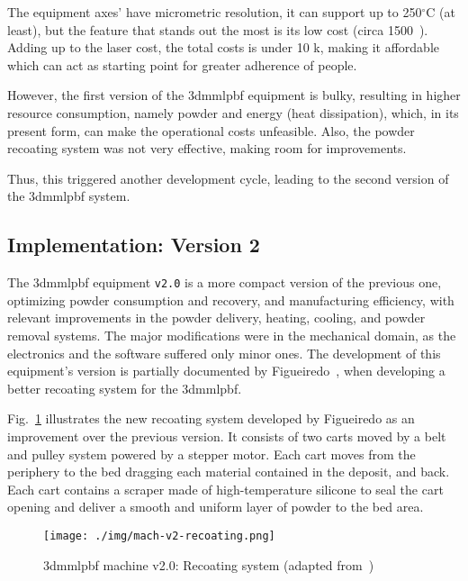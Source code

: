 The equipment axes' have micrometric resolution, it can support up to
250$^{\circ}$C (at least), but the feature that stands out the most is its low
cost (circa 1500~\texteuro). Adding up to the laser cost, the total costs is
under 10 k\texteuro, making it affordable which can act as starting point for
greater adherence of people.

However, the first version of the \gls{3dmmlpbf} equipment is bulky, resulting in
higher resource consumption, namely powder and energy (heat dissipation), which,
in its present form, can make the operational costs unfeasible. Also, the powder
recoating system was not very effective, making room for improvements.

Thus, this triggered another development cycle, leading to the second version
of the \gls{3dmmlpbf} system.

\subsection{Implementation: Version 2}%
\label{sec:version-2}
The \gls{3dmmlpbf} equipment \texttt{v2.0} is a more compact version of the
previous one, optimizing powder consumption and recovery, and manufacturing
efficiency, with relevant improvements in the powder delivery, heating, cooling,
and powder removal systems.
The major modifications were in the mechanical domain, as the electronics and
the software suffered only minor ones.
The development of this equipment's version is partially documented by
Figueiredo~\cite{diogoTese}, when developing a better recoating system for the
\gls{3dmmlpbf}.

Fig.~\ref{fig:mach-v2-recoat} illustrates the new recoating system
developed by Figueiredo as an improvement over the previous version. It consists
of two carts moved by a belt and pulley system powered by a stepper motor. Each
cart moves from the periphery to the bed dragging each material contained in the
deposit, and back. Each cart contains a scraper made of high-temperature
silicone to seal the cart opening and deliver a smooth and uniform layer of
powder to the bed area.
%
\begin{figure}[!hbt]
  \centering
    \texttt{[image: ./img/mach-v2-recoating.png]}
  \caption[\gls{3dmmlpbf} machine v2.0: Recoating system]{\gls{3dmmlpbf} machine v2.0: Recoating system (adapted from~\cite{diogoTese})}%
  \label{fig:mach-v2-recoat}
\end{figure}

